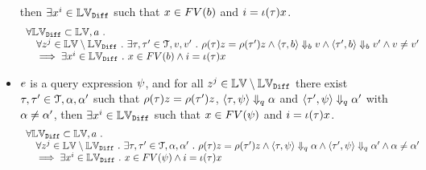 \begin{lem}
\begin{itemize}
	then $\exists x^i \in \mathbb{LV}_{\mathtt{Diff}} $ 
	such that $x \in FV(b)$ and $i = \iota(\mathtt{\tau}) x$.
	\[
		\begin{array}{l}
		\forall \mathbb{LV}_{\mathtt{Diff}}  \subset \mathbb{LV},  
		a ~.~
		\\ \quad
		\forall z^j \in \mathbb{LV} \setminus \mathbb{LV}_{\mathtt{Diff}} ~.~ 
		\exists \mathtt{\tau}, \mathtt{\tau}' \in \mathcal{T}, v, v' ~.~ 
		\rho(\mathtt{\tau}) z = \rho(\mathtt{\tau}') z 
		\land 
		\langle \mathtt{\tau}, b \rangle \Downarrow_b v 
		\land \langle \mathtt{\tau}', b \rangle \Downarrow_b v' \land v \neq v'
		\\ \quad
		\implies \exists x^i \in \mathbb{LV}_{\mathtt{Diff}} ~.~ 
		x \in FV(b) \land i = \iota(\mathtt{\tau}) x
		\end{array}
	\]
% 
	\item $e$ is a query expression $\psi$,
	and for all $z^j \in \mathbb{LV} \setminus \mathbb{LV}_{\mathtt{Diff}}$ 
	there exist $\mathtt{\tau}, \mathtt{\tau}' \in \mathcal{T}, \alpha, \alpha'$ such that 
	$\rho(\mathtt{\tau}) z = \rho(\mathtt{\tau}') z$,
	$\langle \mathtt{\tau}, \psi \rangle \Downarrow_q \alpha$ and 
	$\langle \mathtt{\tau}', \psi \rangle \Downarrow_q \alpha'$ with $\alpha \neq \alpha'$,
	then $\exists x^i \in \mathbb{LV}_{\mathtt{Diff}} $ 
	such that $x \in FV(\psi)$ and $i = \iota(\mathtt{\tau}) x$.
	\[
		\begin{array}{l}
		\forall \mathbb{LV}_{\mathtt{Diff}}  \subset \mathbb{LV},  
		a ~.~
		\\ \quad
		\forall z^j \in \mathbb{LV} \setminus \mathbb{LV}_{\mathtt{Diff}} ~.~ 
		\exists \mathtt{\tau}, \mathtt{\tau}' \in \mathcal{T}, \alpha, \alpha' ~.~ 
		\rho(\mathtt{\tau}) z = \rho(\mathtt{\tau}') z 
		\land 
		\langle \mathtt{\tau}, \psi \rangle \Downarrow_q \alpha 
		\land \langle \mathtt{\tau}', \psi \rangle \Downarrow_q \alpha' \land \alpha \neq \alpha'
		\\ \quad
		\implies \exists x^i \in \mathbb{LV}_{\mathtt{Diff}} ~.~ 
		x \in FV(\psi) \land i = \iota(\mathtt{\tau}) x
		\end{array}
	\]
	\end{itemize}
	\end{lem}
